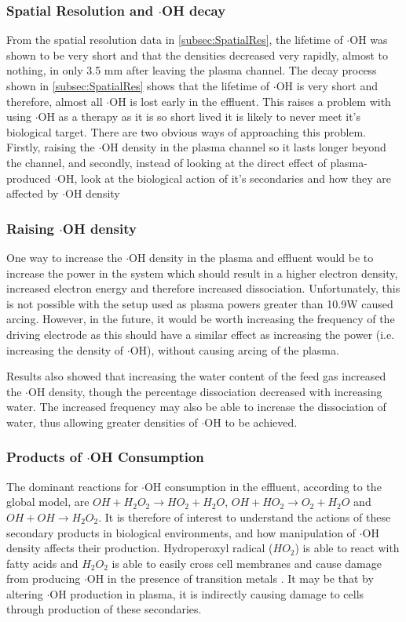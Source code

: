 \documentclass[11pt, oneside]{article}   	%
\begin{document}
\subsubsection{Spatial Resolution and $\cdot$OH decay}
From the spatial resolution data in \ref{subsec:SpatialRes}, the lifetime of $\cdot$OH was shown to be very short and that the densities decreased very rapidly, almost to nothing, in only 3.5 mm after leaving the plasma channel. 
The decay process shown in \ref{subsec:SpatialRes} shows that the lifetime of $\cdot$OH is very short and therefore, almost all $\cdot$OH is lost early in the effluent. 
This raises a problem with using $\cdot$OH as a therapy as it is so short lived it is likely to never meet it's biological target.
There are two obvious ways of approaching this problem. Firstly, raising the $\cdot$OH density in the plasma channel so it lasts longer beyond the channel, and secondly, instead of looking at the direct effect of plasma-produced $\cdot$OH, look at the biological action of it's secondaries and how they are affected by $\cdot$OH density

\subsubsection{Raising $\cdot$OH density}

One way to increase the $\cdot$OH density in the plasma and effluent would be to increase the power in the system which should result in a higher electron density, increased electron energy and therefore increased dissociation.
Unfortunately, this is not possible with the setup used as plasma powers greater than 10.9W caused arcing.
However, in the future, it would be worth increasing the frequency of the driving electrode as this should have a similar effect as increasing the power (i.e. increasing the density of $\cdot$OH), without causing arcing of the plasma.

Results also showed that increasing the water content of the feed gas increased the $\cdot$OH density, though the percentage dissociation decreased with increasing water. 
The increased frequency may also be able to increase the dissociation of water, thus allowing greater densities of $\cdot$OH to be achieved.
 

\subsubsection{Products of $\cdot$OH Consumption}

The dominant reactions for $\cdot$OH consumption in the effluent, according to the global model, are $ OH + H_2O_2 \rightarrow HO_2 + H_2O$, $OH + HO_2 \rightarrow O_2 + H_2O$ and $OH + OH \rightarrow H_2O_2$.
It is therefore of interest to understand the actions of these secondary products in biological environments, and how manipulation of $\cdot$OH density affects their production. 
Hydroperoxyl radical ($HO_2$) is able to react with fatty acids and $H_2O_2$ is able to easily cross cell membranes and cause damage from producing $\cdot$OH in the presence of transition metals \cite{Phaniendra2015}.
It may be that by altering $\cdot$OH production in plasma, it is indirectly causing damage to cells through production of these secondaries.
\end{document}
